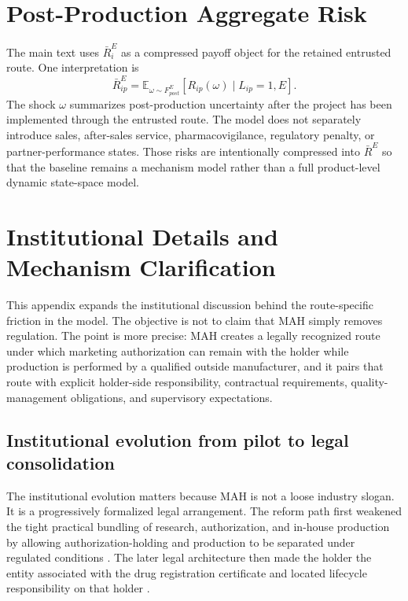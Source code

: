 \documentclass[12pt]{article}
\newcommand{\E}{\mathbb{E}}
\newcommand{\1}{\mathbf{1}}
\begin{document}
\section{Post-Production Aggregate Risk}
\label{sec:post_risk_appendix}

The main text uses $\bar R_i^E$ as a compressed payoff object for the retained entrusted route. One interpretation is
\begin{equation}
    \bar R^E_{ip}
    =
    \E_{\omega\sim F_{post}^E}
    [R_{ip}(\omega)\mid L_{ip}=1,E].
    \label{eq:post_risk_Rbar}
\end{equation}
The shock $\omega$ summarizes post-production uncertainty after the project has been implemented through the entrusted route. The model does not separately introduce sales, after-sales service, pharmacovigilance, regulatory penalty, or partner-performance states. Those risks are intentionally compressed into $\bar R^E$ so that the baseline remains a mechanism model rather than a full product-level dynamic state-space model.

\section{Institutional Details and Mechanism Clarification}

This appendix expands the institutional discussion behind the route-specific friction in the model. The objective is not to claim that MAH simply removes regulation. The point is more precise: MAH creates a legally recognized route under which marketing authorization can remain with the holder while production is performed by a qualified outside manufacturer, and it pairs that route with explicit holder-side responsibility, contractual requirements, quality-management obligations, and supervisory expectations.

\subsection{Institutional evolution from pilot to legal consolidation}

The institutional evolution matters because MAH is not a loose industry slogan. It is a progressively formalized legal arrangement. The reform path first weakened the tight practical bundling of research, authorization, and in-house production by allowing authorization-holding and production to be separated under regulated conditions \citep{StateCouncilMAHPilot2016,CFDAMAHImplementation2016}. The later legal architecture then made the holder the entity associated with the drug registration certificate and located lifecycle responsibility on that holder \citep{DrugAdministrationLaw2019,NMPAHolderResponsibility2022}.
\end{document}
